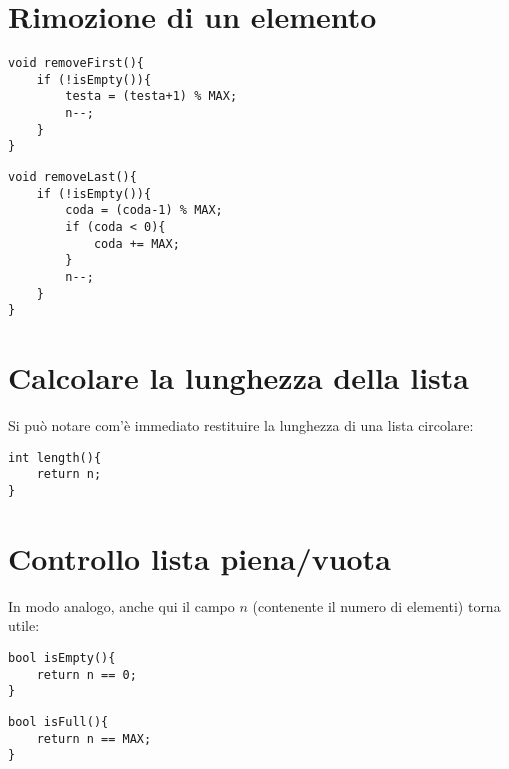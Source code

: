 \section{Rimozione di un elemento}
\begin{lstlisting}[title={Metodo per la rimozione della testa da una lista circolare}]
void removeFirst(){
    if (!isEmpty()){
        testa = (testa+1) % MAX;
        n--;
    }
}
\end{lstlisting}
\begin{lstlisting}[title={Metodo per la rimozione della coda da una lista circolare}]
void removeLast(){
    if (!isEmpty()){
        coda = (coda-1) % MAX;
        if (coda < 0){
            coda += MAX;
        }
        n--;
    }
}
\end{lstlisting}

\section{Calcolare la lunghezza della lista}
Si può notare com'è immediato restituire la lunghezza di una lista circolare:
\begin{lstlisting}[title={Metodo per restituire la lunghezza di una lista circolare}]
int length(){
    return n;
}
\end{lstlisting}

\section{Controllo lista piena/vuota}
In modo analogo, anche qui il campo $n$ (contenente il numero di elementi) torna utile:
\begin{lstlisting}[title={Metodo per controllare se la lista circolare è vuota}]
bool isEmpty(){
    return n == 0;
}
\end{lstlisting}
\begin{lstlisting}[title={Metodo per controllare se la lista circolare è piena}]
bool isFull(){
    return n == MAX;
}
\end{lstlisting}
